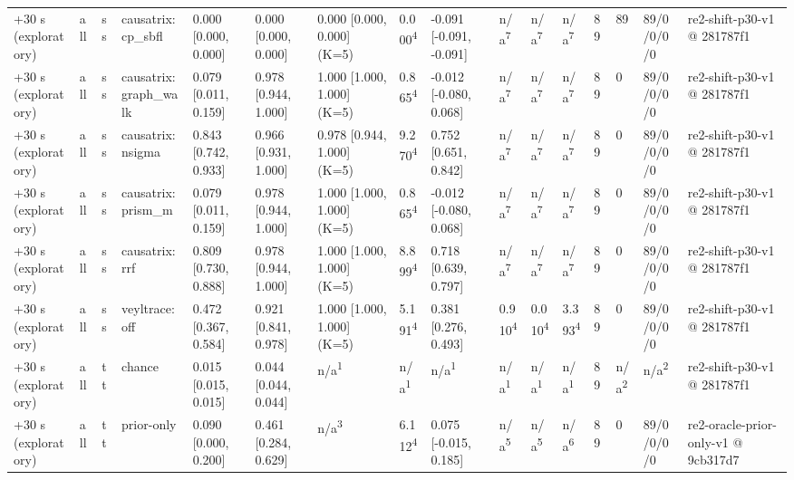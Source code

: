 \begin{table}[t]
\begin{tabular}{llllllllllllllll}
+30 s (exploratory) & all & ss & causatrix:cp\_sbfl & 0.000 [0.000, 0.000] & 0.000 [0.000, 0.000] & 0.000 [0.000, 0.000] (K=5) & 0.000\textsuperscript{4} & -0.091 [-0.091, -0.091] & n/a\textsuperscript{7} & n/a\textsuperscript{7} & n/a\textsuperscript{7} & 89 & 89 & 89/0/0/0/0 & re2-shift-p30-v1 @ 281787f1 \\
+30 s (exploratory) & all & ss & causatrix:graph\_walk & 0.079 [0.011, 0.159] & 0.978 [0.944, 1.000] & 1.000 [1.000, 1.000] (K=5) & 0.865\textsuperscript{4} & -0.012 [-0.080, 0.068] & n/a\textsuperscript{7} & n/a\textsuperscript{7} & n/a\textsuperscript{7} & 89 & 0 & 89/0/0/0/0 & re2-shift-p30-v1 @ 281787f1 \\
+30 s (exploratory) & all & ss & causatrix:nsigma & 0.843 [0.742, 0.933] & 0.966 [0.931, 1.000] & 0.978 [0.944, 1.000] (K=5) & 9.270\textsuperscript{4} & 0.752 [0.651, 0.842] & n/a\textsuperscript{7} & n/a\textsuperscript{7} & n/a\textsuperscript{7} & 89 & 0 & 89/0/0/0/0 & re2-shift-p30-v1 @ 281787f1 \\
+30 s (exploratory) & all & ss & causatrix:prism\_m & 0.079 [0.011, 0.159] & 0.978 [0.944, 1.000] & 1.000 [1.000, 1.000] (K=5) & 0.865\textsuperscript{4} & -0.012 [-0.080, 0.068] & n/a\textsuperscript{7} & n/a\textsuperscript{7} & n/a\textsuperscript{7} & 89 & 0 & 89/0/0/0/0 & re2-shift-p30-v1 @ 281787f1 \\
+30 s (exploratory) & all & ss & causatrix:rrf & 0.809 [0.730, 0.888] & 0.978 [0.944, 1.000] & 1.000 [1.000, 1.000] (K=5) & 8.899\textsuperscript{4} & 0.718 [0.639, 0.797] & n/a\textsuperscript{7} & n/a\textsuperscript{7} & n/a\textsuperscript{7} & 89 & 0 & 89/0/0/0/0 & re2-shift-p30-v1 @ 281787f1 \\
+30 s (exploratory) & all & ss & veyltrace:off & 0.472 [0.367, 0.584] & 0.921 [0.841, 0.978] & 1.000 [1.000, 1.000] (K=5) & 5.191\textsuperscript{4} & 0.381 [0.276, 0.493] & 0.910\textsuperscript{4} & 0.010\textsuperscript{4} & 3.393\textsuperscript{4} & 89 & 0 & 89/0/0/0/0 & re2-shift-p30-v1 @ 281787f1 \\
+30 s (exploratory) & all & tt & chance & 0.015 [0.015, 0.015] & 0.044 [0.044, 0.044] & n/a\textsuperscript{1} & n/a\textsuperscript{1} & n/a\textsuperscript{1} & n/a\textsuperscript{1} & n/a\textsuperscript{1} & n/a\textsuperscript{1} & 89 & n/a\textsuperscript{2} & n/a\textsuperscript{2} & re2-shift-p30-v1 @ 281787f1 \\
+30 s (exploratory) & all & tt & prior-only & 0.090 [0.000, 0.200] & 0.461 [0.284, 0.629] & n/a\textsuperscript{3} & 6.112\textsuperscript{4} & 0.075 [-0.015, 0.185] & n/a\textsuperscript{5} & n/a\textsuperscript{5} & n/a\textsuperscript{6} & 89 & 0 & 89/0/0/0/0 & re2-oracle-prior-only-v1 @ 9cb317d7 \\

\end{tabular}
\end{table}
